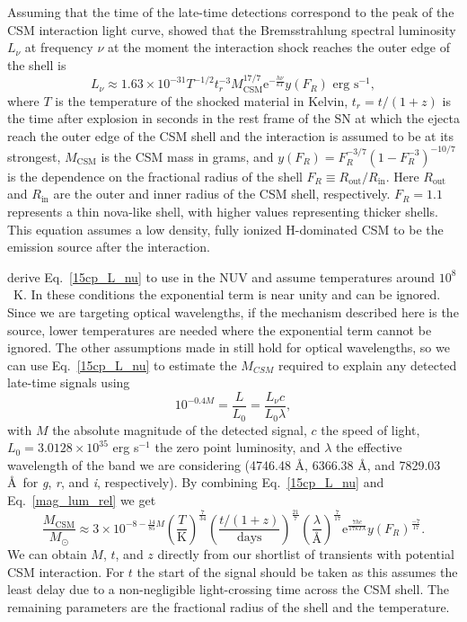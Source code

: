 \documentclass[a4paper,oneside,12pt, class=Latex/Classes/PhDthesisPSnPDF, crop=false]{standalone}
\begin{document}
 Assuming that the time of the late-time detections correspond to the peak of the CSM interaction light curve, \citet{2015cp} showed that the Bremsstrahlung spectral luminosity $L_\nu$ at frequency $\nu$ at the moment the interaction shock reaches the outer edge of the shell is
\begin{equation}
    \label{15cp_L_nu}
    L_\nu \approx 1.63 \times 10^{-31} T^{-1/2} t_r^{-3} M_\text{CSM}^{17/7} \text{e}^{-\frac{h\nu}{kT}} y(F_R) \text{ erg s}^{-1},
\end{equation}
where $T$ is the temperature of the shocked material in Kelvin, $t_r = t/(1+z)$ is the time after explosion in seconds in the rest frame of the SN %
at which the ejecta reach the outer edge of the CSM shell and the interaction is assumed to be at its strongest, $M_\text{CSM}$ is the CSM mass in grams, and $y(F_R) = F_R^{-3/7}(1-F_R^{-3})^{-10/7}$ is the dependence on the fractional radius of the shell $F_R \equiv R_\text{out} / R_\text{in}$. Here $R_\text{out}$ and $R_\text{in}$ are the outer and inner radius of the CSM shell, respectively. $F_R = 1.1$ represents a thin nova-like shell, with higher values representing thicker shells. This equation assumes a low density, fully ionized H-dominated CSM to be the emission source after the interaction. 

\citet{2015cp} derive Eq.~\ref{15cp_L_nu} to use in the NUV and assume temperatures around $10^8$~K. In these conditions the exponential term is near unity and can be ignored. Since we are targeting optical wavelengths, if the mechanism described here is the source, lower temperatures are needed where the exponential term cannot be ignored. The other assumptions made in \citet{2015cp} still hold for optical wavelengths, so we can use Eq.~\ref{15cp_L_nu} to estimate the $M_{CSM}$ required to explain any detected late-time signals using
\begin{equation}
    \label{mag_lum_rel}
    10^{-0.4M} = \frac{L}{L_0} = \frac{L_\nu c}{L_0 \lambda},
\end{equation}
with $M$ the absolute magnitude of the detected signal, $c$ the speed of light, $L_0 = 3.0128 \times 10^{35}$ erg s$^{-1}$ the zero point luminosity, and $\lambda$ the effective wavelength of the band we are considering (4746.48 \AA, 6366.38 \AA, and 7829.03 \AA~for \textit{g}, \textit{r}, and \textit{i}, respectively). By combining Eq.~\ref{15cp_L_nu} and Eq.~\ref{mag_lum_rel} we get
\begin{equation}
    \frac{M_\text{CSM}}{M_\odot} \approx 3 \times 10^{-8-\frac{14}{85}M} \left(\frac{T}{\text{K}}\right)^{\frac{7}{34}} \left(\frac{t/(1+z)}{\text{days}}\right)^{\frac{21}{7}} \left(\frac{\lambda}{\text{\AA}}\right)^{\frac{7}{17}} \text{e}^{\frac{7hc}{17kT\lambda}} y(F_R)^{\frac{-7}{17}}.
    \label{M_CSM_eq}
\end{equation}
We can obtain $M$, $t$, and $z$ directly from our shortlist of transients with potential CSM interaction. For $t$ the start of the signal should be taken as this assumes the least delay due to a non-negligible light-crossing time across the CSM shell. The remaining parameters are the fractional radius of the shell and the temperature.
\end{document}
